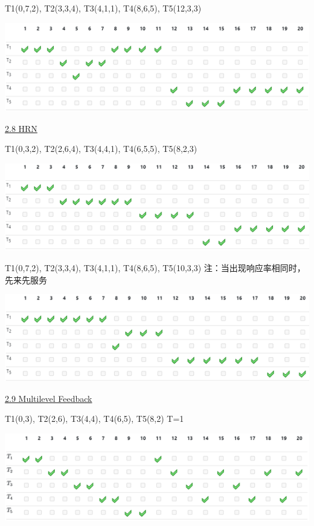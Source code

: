 \documentclass[fleqn]{article}
\begin{document}
T1(0,7,2), T2(3,3,4), T3(4,1,1), T4(8,6,5), T5(12,3,3)

\begin{center}
    \includegraphics{15.png}
\end{center}

\noindent\uline{2.8 HRN}

T1(0,3,2), T2(2,6,4), T3(4,4,1), T4(6,5,5), T5(8,2,3)

\begin{center}
    \includegraphics{16.png}
\end{center}

T1(0,7,2), T2(3,3,4), T3(4,1,1), T4(8,6,5), T5(10,3,3)
注：当出现响应率相同时，先来先服务

\begin{center}
    \includegraphics{17.png}
\end{center}

\noindent\uline{2.9 Multilevel Feedback}

T1(0,3), T2(2,6), T3(4,4), T4(6,5), T5(8,2)
T=1

\begin{center}
    \includegraphics{18.png}
\end{center}
\end{document}
